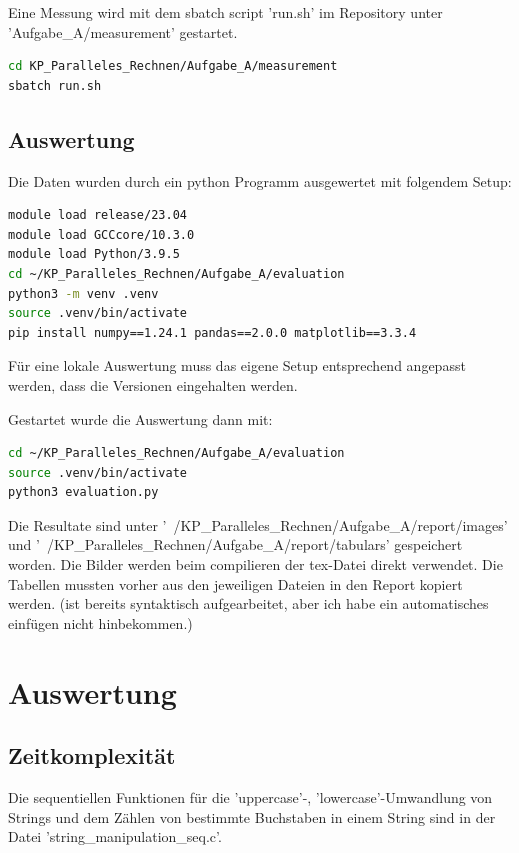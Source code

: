 \documentclass[plainarticle,zihtitle,german,final,hyperref,utf8]{zihpub}
\begin{document}
Eine Messung wird mit dem sbatch script 'run.sh' im Repository unter 'Aufgabe\_A/measurement' gestartet.

\begin{lstlisting}[language=bash]
cd KP_Paralleles_Rechnen/Aufgabe_A/measurement
sbatch run.sh
\end{lstlisting}

\subsection{Auswertung}
Die Daten wurden durch ein python Programm ausgewertet mit folgendem Setup:
\begin{lstlisting}[language=bash]
module load release/23.04
module load GCCcore/10.3.0
module load Python/3.9.5
cd ~/KP_Paralleles_Rechnen/Aufgabe_A/evaluation
python3 -m venv .venv
source .venv/bin/activate
pip install numpy==1.24.1 pandas==2.0.0 matplotlib==3.3.4
\end{lstlisting}

Für eine lokale Auswertung muss das eigene Setup entsprechend angepasst werden, dass die Versionen eingehalten werden.

Gestartet wurde die Auswertung dann mit:

\begin{lstlisting}[language=bash]
cd ~/KP_Paralleles_Rechnen/Aufgabe_A/evaluation
source .venv/bin/activate
python3 evaluation.py
\end{lstlisting}

Die Resultate sind unter '~/KP\_Paralleles\_Rechnen/Aufgabe\_A/report/images' und  '~/KP\_Paralleles\_Rechnen/Aufgabe\_A/report/tabulars' gespeichert worden.
Die Bilder werden beim compilieren der tex-Datei direkt verwendet. Die Tabellen mussten vorher aus den jeweiligen Dateien in den Report kopiert werden. (ist bereits syntaktisch aufgearbeitet, aber ich habe ein automatisches einfügen nicht hinbekommen.)

\section{Auswertung}
\subsection{Zeitkomplexität}
Die se­quen­ti­ellen Funktionen für die 'uppercase'-, 'lowercase'-Umwandlung von Strings und dem Zählen von bestimmte Buchstaben in einem String sind in der Datei 'string\_manipulation\_seq.c'.
\end{document}
